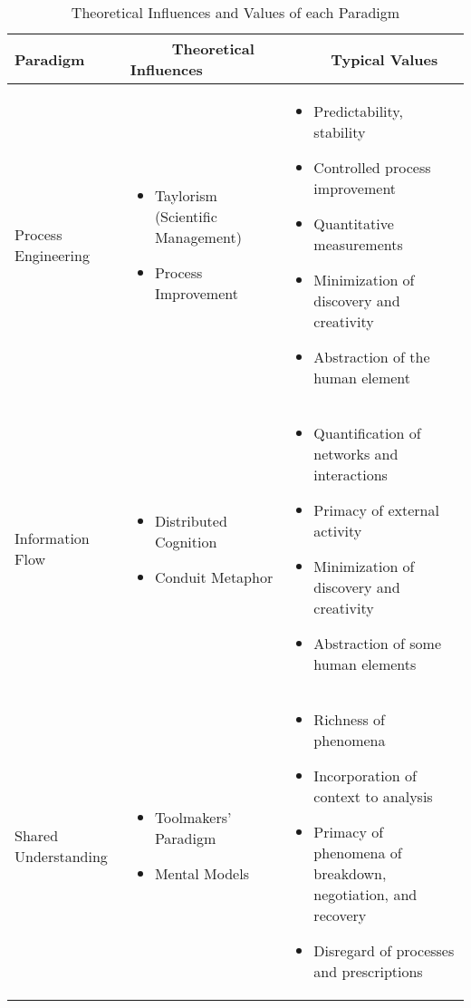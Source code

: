 \begin{table}[tph]
\caption{\label{ParadigmInfluencesValues} Theoretical Influences and Values of each Paradigm}
\centering
\singlespacing
\footnotesize{\begin{tabular}{p{3.4cm}p{4.4cm}p{5.8cm}}
\hline \hline
\vspace{1pt}\bfseries Paradigm & \vspace{1pt}\bfseries ~~~~~Theoretical Influences & \vspace{1pt}\bfseries ~~~~~Typical Values \\
\hline
\vspace{10pt}Process Engineering &
\begin{itemize}
\item Taylorism (Scientific Management)
\item Process Improvement
\end{itemize}
&
\begin{itemize}
\item Predictability, stability
\item Controlled process improvement
\item Quantitative measurements
\item Minimization of discovery and creativity
\item Abstraction of the human element
\end{itemize} \\
\hline
\vspace{10pt}Information Flow &
\begin{itemize}
\item Distributed Cognition
\item Conduit Metaphor
\end{itemize}
&
\begin{itemize}
\item Quantification of networks and interactions
\item Primacy of external activity
\item Minimization of discovery and creativity
\item Abstraction of some human elements
\end{itemize} \\
\hline
\vspace{10pt}Shared Understanding &
\begin{itemize}
\item Toolmakers' Paradigm
\item Mental Models
\end{itemize}
&
\begin{itemize}
\item Richness of phenomena
\item Incorporation of context to analysis
\item Primacy of phenomena of breakdown, negotiation, and recovery
\item Disregard of processes and prescriptions
\end{itemize} \\
\hline
\end{tabular}}
\end{table}

